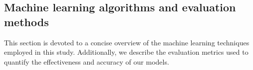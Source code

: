 \documentclass[gmd, manuscript]{copernicus}
\begin{document}
\subsection{Machine learning algorithms and evaluation methods}
This section is devoted to a concise overview of the machine learning techniques employed in this study. Additionally, we describe the evaluation metrics used to quantify the effectiveness and accuracy of our models.
\end{document}
